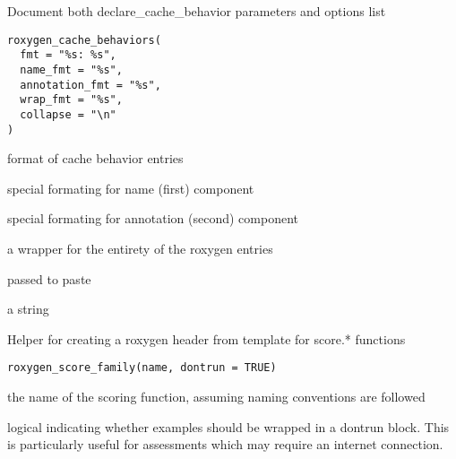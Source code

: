 \documentclass[a4paper]{book}
\begin{document}
%
\begin{Description}
Document both declare\_cache\_behavior parameters and options list
\end{Description}
%
\begin{Usage}
\begin{verbatim}
roxygen_cache_behaviors(
  fmt = "%s: %s",
  name_fmt = "%s",
  annotation_fmt = "%s",
  wrap_fmt = "%s",
  collapse = "\n"
)
\end{verbatim}
\end{Usage}
%
\begin{Arguments}
\begin{ldescription}
\item[\code{fmt}] format of cache behavior entries

\item[\code{name\_fmt}] special formating for name (first) component

\item[\code{annotation\_fmt}] special formating for annotation (second) component

\item[\code{wrap\_fmt}] a wrapper for the entirety of the roxygen entries

\item[\code{collapse}] passed to paste
\end{ldescription}
\end{Arguments}
%
\begin{Value}
a string
\end{Value}
%
\begin{Description}
Helper for creating a roxygen header from template for score.* functions
\end{Description}
%
\begin{Usage}
\begin{verbatim}
roxygen_score_family(name, dontrun = TRUE)
\end{verbatim}
\end{Usage}
%
\begin{Arguments}
\begin{ldescription}
\item[\code{name}] the name of the scoring function, assuming naming conventions are
followed

\item[\code{dontrun}] logical indicating whether examples should be wrapped in
a dontrun block. This is particularly useful for assessments which may
require an internet connection.
\end{ldescription}
\end{Arguments}
\end{document}

